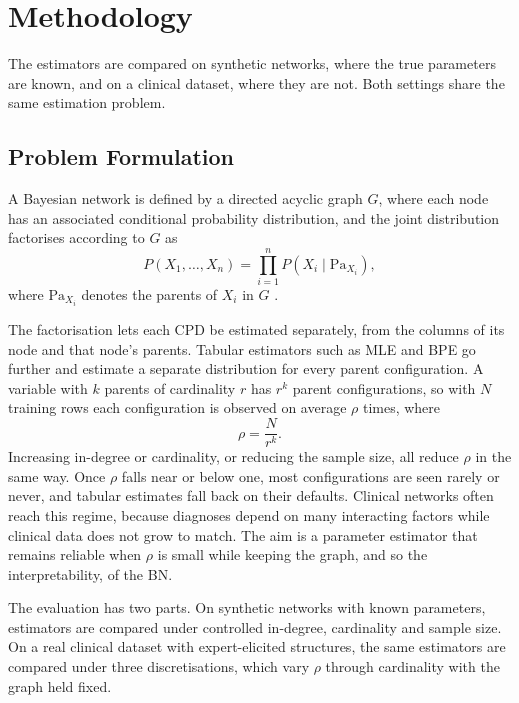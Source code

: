 \documentclass[a4paper,fleqn]{cas-dc}
\newcommand{\Pa}{\mathrm{Pa}}
\begin{document}
\section{Methodology}\label{sec:method}

The estimators are compared on synthetic networks, where the true parameters are known, and on a clinical dataset, where they are not. Both settings share the same estimation problem.

\subsection{Problem Formulation}

A Bayesian network is defined by a directed acyclic graph $G$, where each node has an associated conditional probability distribution, and the joint distribution factorises according to $G$ as
\begin{equation*}
P(X_1,\dots,X_n)=\prod_{i=1}^{n} P(X_i\mid\Pa_{X_i}),
\end{equation*}
where $\Pa_{X_i}$ denotes the parents of $X_i$ in $G$ \citep{koller2007graphical}.

The factorisation lets each CPD be estimated separately, from the columns of its node and that node's parents. Tabular estimators such as MLE and BPE go further and estimate a separate distribution for every parent configuration. A variable with $k$ parents of cardinality $r$ has $r^k$ parent configurations, so with $N$ training rows each configuration is observed on average $\rho$ times, where
\begin{equation}
\rho = \frac{N}{r^{k}}.
\label{eq:rho}
\end{equation}
Increasing in-degree or cardinality, or reducing the sample size, all reduce $\rho$ in the same way. Once $\rho$ falls near or below one, most configurations are seen rarely or never, and tabular estimates fall back on their defaults. Clinical networks often reach this regime, because diagnoses depend on many interacting factors while clinical data does not grow to match. The aim is a parameter estimator that remains reliable when $\rho$ is small while keeping the graph, and so the interpretability, of the BN.

The evaluation has two parts. On synthetic networks with known parameters, estimators are compared under controlled in-degree, cardinality and sample size. On a real clinical dataset with expert-elicited structures, the same estimators are compared under three discretisations, which vary $\rho$ through cardinality with the graph held fixed.
\end{document}
